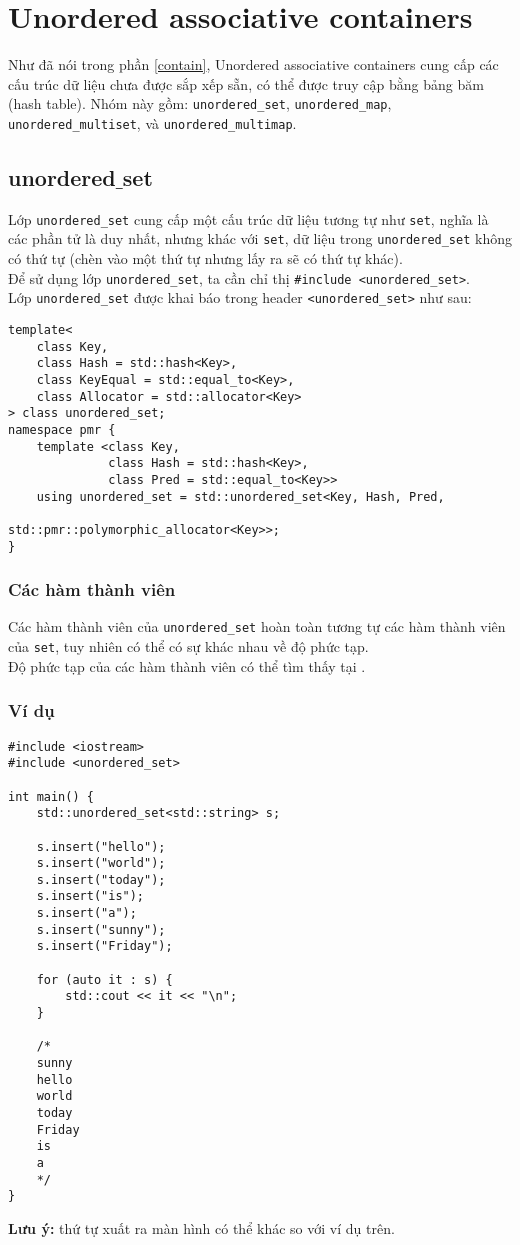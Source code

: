 \section{Unordered associative containers}
Như đã nói trong phần \ref{contain}, Unordered associative containers cung cấp các cấu trúc dữ liệu chưa được sắp xếp sẵn, có thể được truy cập bằng bảng băm (hash table). Nhóm này gồm: \lstinline{unordered_set}, \lstinline{unordered_map}, \lstinline{unordered_multiset}, và \lstinline{unordered_multimap}.
\subsection{unordered$\_$set}
Lớp \lstinline{unordered_set} cung cấp một cấu trúc dữ liệu tương tự như \lstinline{set}, nghĩa là các phần tử là duy nhất, nhưng khác với \lstinline{set}, dữ liệu trong \lstinline{unordered_set} không có thứ tự (chèn vào một thứ tự nhưng lấy ra sẽ có thứ tự khác).\\
Để sử dụng lớp \lstinline{unordered_set}, ta cần chỉ thị  \lstinline{#include <unordered_set>}.\\
Lớp  \lstinline{unordered_set} được khai báo trong header  \lstinline{<unordered_set>} như sau: \cite{unset}
\begin{lstlisting}
template<
    class Key,
    class Hash = std::hash<Key>,
    class KeyEqual = std::equal_to<Key>,
    class Allocator = std::allocator<Key>
> class unordered_set;
namespace pmr {
    template <class Key,
              class Hash = std::hash<Key>,
              class Pred = std::equal_to<Key>>
    using unordered_set = std::unordered_set<Key, Hash, Pred,
                                             std::pmr::polymorphic_allocator<Key>>;
}
\end{lstlisting}
\subsubsection{Các hàm thành viên}
Các hàm thành viên của \lstinline{unordered_set} hoàn toàn tương tự các hàm thành viên của \lstinline{set}, tuy nhiên có thể có sự khác nhau về độ phức tạp.\\
Độ phức tạp của các hàm thành viên có thể tìm thấy tại \cite{unset}.
\subsubsection{Ví dụ}
\begin{lstlisting}
#include <iostream>
#include <unordered_set>

int main() {
    std::unordered_set<std::string> s;
    
    s.insert("hello");
    s.insert("world");
    s.insert("today");
    s.insert("is");
    s.insert("a");
    s.insert("sunny");
    s.insert("Friday");

    for (auto it : s) {
        std::cout << it << "\n";
    }
    
    /*
    sunny
    hello
    world
    today
    Friday
    is
    a    
    */
}
\end{lstlisting}
\textbf{Lưu ý:} thứ tự xuất ra màn hình có thể khác so với ví dụ trên.

